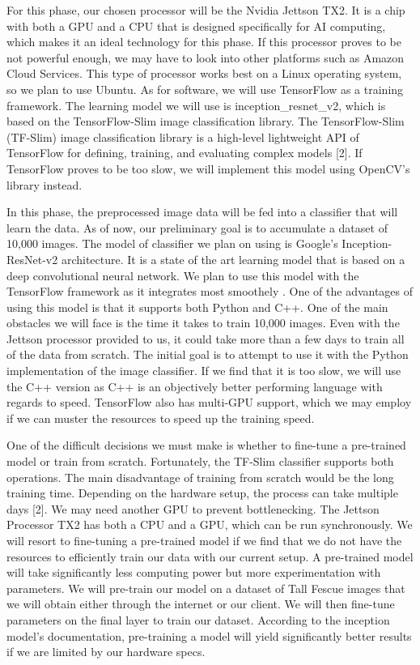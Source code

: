 \documentclass[onecolumn, draftclsnofoot,10pt, compsoc]{IEEEtran}
\begin{document}
For this phase, our chosen processor will be the Nvidia Jettson TX2. It is a chip with both a GPU and a CPU that is designed specifically for AI computing, which makes it an ideal technology for this phase. If this processor proves to be not powerful enough, we may have to look into other platforms such as Amazon Cloud Services. This type of processor works best on a Linux operating system, so we plan to use Ubuntu. As for software, we will use TensorFlow as a training framework. The learning model we will use is inception\_resnet\_v2, which is based on the TensorFlow-Slim image classification library. The TensorFlow-Slim  (TF-Slim) image classification library is a high-level lightweight API of TensorFlow for defining, training, and evaluating complex models [2]. If TensorFlow proves to be too slow, we will implement this model using OpenCV's library instead. 


In this phase, the preprocessed image data will be fed into a classifier that will learn the data. As of now, our preliminary goal is to accumulate a dataset of 10,000 images. The model of classifier we plan on using is Google's Inception-ResNet-v2 architecture. It is a state of the art learning model that is based on a deep convolutional neural network. We plan to use this model with the TensorFlow framework as it integrates most smoothely . One of the advantages of using this model is that it supports both Python and C++. One of the main obstacles we will face is the time it takes to train 10,000 images. Even with the Jettson processor provided to us, it could take more than a few days to train all of the data from scratch. The initial goal is to attempt to use it with the Python implementation of the image classifier. If we find that it is too slow, we will use the C++ version as C++ is an objectively better performing language with regards to speed. TensorFlow also has multi-GPU support, which we may employ if we can muster the resources to speed up the training speed.

One of the difficult decisions we must make is whether to fine-tune a pre-trained model or train from scratch. Fortunately, the TF-Slim classifier supports both operations. The main disadvantage of training from scratch would be the long training time. Depending on the hardware setup, the process can take multiple days [2]. We may need another GPU to prevent bottlenecking. The Jettson Processor TX2 has both a CPU and a GPU, which can be run synchronously. We will resort to fine-tuning a pre-trained model if we find that we do not have the resources to efficiently train our data with our current setup. A pre-trained model will take significantly less computing power but more experimentation with parameters. We will pre-train our model on a dataset of Tall Fescue images that we will obtain either through the internet or our client. We will then fine-tune parameters on the final layer to train our dataset. According to the inception model's documentation, pre-training a model will yield significantly better results if we are limited by our hardware specs. 
\end{document}
